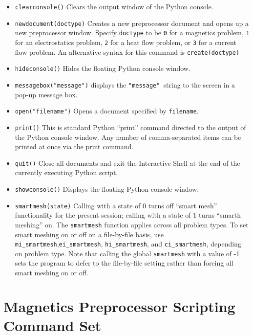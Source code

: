 \begin{itemize}

\item {\tt clearconsole()} Clears the output window of the Python console.

\item {\tt newdocument(doctype)} Creates a new preprocessor document
and opens up a new preprocessor window.  Specify {\tt doctype} to
be {\tt 0} for a magnetics problem, {\tt 1} for an electrostatics
problem, {\tt 2} for a heat flow problem, or {\tt 3} for a current
flow problem. An alternative syntax for this command is {\tt create(doctype)} 

\item{\tt hideconsole()} Hides the floating Python console window.


\item \texttt{messagebox("message")} displays the \texttt{"message" }string to the
screen in a pop-up message box.

\item {\tt open("filename")} Opens a document specified by
{\tt filename}.


\item \texttt{print()} This is standard Python ``print'' command directed to the
output of the Python console window. Any number of comma-separated items can be
printed at once via the print command.


\item {\tt quit()} Close all documents and exit the Interactive
Shell at the end of the currently executing Python script.


\item{\tt showconsole()} Displays the floating Python console window.


\item{\tt smartmesh(state)} Calling with a state of 0 turns off ``smart mesh'' functionality for the present session; calling with a state of 1 turns ``smarth meshing'' on. The {\tt smartmesh} function applies across all problem types. 
To set smart meshing on or off on a file-by-file basis, use  \verb+mi_smartmesh+,\verb+ei_smartmesh+, \verb+hi_smartmesh+, and \verb+ci_smartmesh+, depending on problem type.  Note that calling the global \verb+smartmesh+ with a value of -1 sets the program to defer to the file-by-file setting rather than forcing all smart meshing on or off.
\end{itemize}


\section{Magnetics Preprocessor Scripting Command Set}

